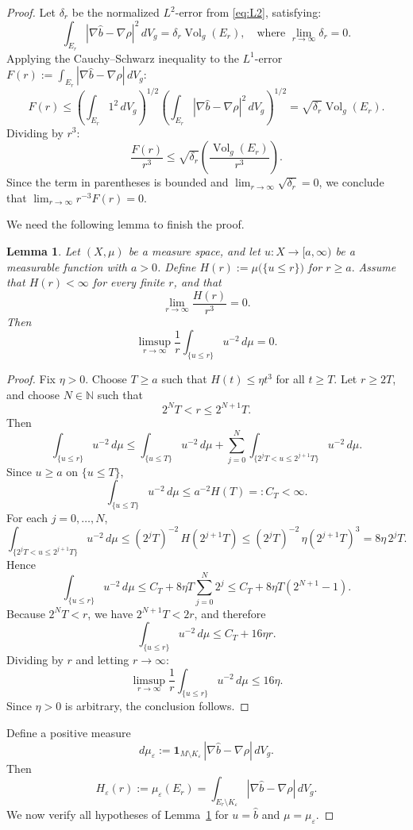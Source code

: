 \documentclass[12pt,oneside,a4paper]{article}
\theoremstyle{mytheorem}
\newtheorem{lemma}[definition]{Lemma}
\theoremstyle{remark}
\begin{document}
\begin{proof}
Let $\delta_r$ be the normalized $L^2$-error from \eqref{eq:L2}, satisfying:$$\int_{E_r} |\nabla \widehat{b} - \nabla \rho|^2 \, dV_g = \delta_r \operatorname{Vol}_g(E_r), \quad \text{where } \lim_{r \to \infty} \delta_r = 0.$$Applying the Cauchy–Schwarz inequality to the $L^1$-error $F(r) := \int_{E_r} |\nabla \widehat{b} - \nabla \rho| \, dV_g$:$$F(r) \le \left( \int_{E_r} 1^2 \, dV_g \right)^{1/2} \left( \int_{E_r} |\nabla \widehat{b} - \nabla \rho|^2 \, dV_g \right)^{1/2} = \sqrt{\delta_r} \operatorname{Vol}_g(E_r).$$Dividing by $r^3$:$$\frac{F(r)}{r^3} \le \sqrt{\delta_r} \left( \frac{\operatorname{Vol}_g(E_r)}{r^3} \right).$$Since the term in parentheses is bounded and $\lim_{r \to \infty} \sqrt{\delta_r} = 0$, we conclude that $\lim_{r \to \infty} r^{-3} F(r) = 0$.


We need the following lemma to finish the proof.
\begin{lemma}\label{lem:dyadic-deweight}
Let \((X,\mu)\) be a measure space, and let \(u : X \to [a,\infty)\) be a measurable function with \(a>0\). Define $H(r) := \mu\bigl(\{u \le r\}\bigr)$  for $r \ge a.$
Assume that \(H(r) < \infty\) for every finite \(r\), and that
\[
\lim_{r \to \infty} \frac{H(r)}{r^3} = 0.
\]
Then
\[
\limsup_{r \to \infty} \frac{1}{r} \int_{\{u \le r\}} u^{-2}\, d\mu = 0.
\]
\end{lemma}

\begin{proof}
Fix $\eta>0$. Choose $T\ge a$ such that $H(t)\le \eta t^3$ for all $t\ge T.$ Let $r\ge 2T$, and choose $N\in\mathbb N$ such that
\[
2^N T<r\le 2^{N+1}T.
\]
Then
\[
\int_{\{u\le r\}} u^{-2}\,d\mu
\le
\int_{\{u\le T\}} u^{-2}\,d\mu
+\sum_{j=0}^{N}\int_{\{2^jT<u\le 2^{j+1}T\}} u^{-2}\,d\mu.
\]
Since $u\ge a$ on $\{u\le T\}$,
\[
\int_{\{u\le T\}} u^{-2}\,d\mu \le a^{-2}H(T)=:C_T<\infty.
\]
For each $j=0,\dots,N$,
\[
\int_{\{2^jT<u\le 2^{j+1}T\}} u^{-2}\,d\mu
\le (2^jT)^{-2}\,H(2^{j+1}T)
\le (2^jT)^{-2}\,\eta(2^{j+1}T)^3
=8\eta\,2^jT.
\]
Hence
\[
\int_{\{u\le r\}} u^{-2}\,d\mu
\le C_T+8\eta T\sum_{j=0}^{N}2^j
\le C_T+8\eta T(2^{N+1}-1).
\]
Because $2^N T<r$, we have $2^{N+1}T<2r$, and therefore
\[
\int_{\{u\le r\}} u^{-2}\,d\mu \le C_T+16\eta r.
\]
Dividing by $r$ and letting $r\to\infty$:
\[
\limsup_{r\to\infty}\frac1r\int_{\{u\le r\}} u^{-2}\,d\mu\le 16\eta.
\]
Since $\eta>0$ is arbitrary, the conclusion follows.
\end{proof}




Define a positive measure
\[
d\mu_\varepsilon
:=
\mathbf 1_{M\setminus K_\varepsilon}\,
|\nabla \widehat b-\nabla \rho|\,dV_g.
\]
Then
\[
H_\varepsilon(r):=\mu_\varepsilon(E_r)
=
\int_{E_r\setminus K_\varepsilon}
|\nabla \widehat b-\nabla \rho|\,dV_g.
\]
We now verify all hypotheses of Lemma~\ref{lem:dyadic-deweight} for
$u=\widehat b$ and $\mu=\mu_\varepsilon$.


\end{proof}
\end{document}
